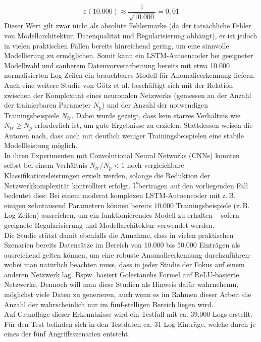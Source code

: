 \documentclass[a4paper,12pt]{article}
\begin{document}
	\[
	\varepsilon(10.000) \approx \frac{1}{\sqrt{10.000}} = 0{,}01
	\]
	Dieser Wert gilt zwar nicht als absolute Fehlermarke (da der tatsächliche Fehler von Modellarchitektur, Datenqualität und Regularisierung abhängt), er ist jedoch in vielen praktischen Fällen bereits hinreichend gering, um eine sinnvolle Modellierung zu ermöglichen. Somit kann ein LSTM-Autoencoder bei geeigneter Modellwahl und sauberem Datenvorverarbeitung bereits mit etwa 10.000 normalisierten Log-Zeilen ein brauchbares Modell für Anomalieerkennung liefern.
	\\[0.5em]
	Auch eine weitere Studie von Götz et al. \cite{Goetz2023} beschäftigt sich mit der Relation zwischen der Komplexität eines neuronalen Netzwerks (gemessen an der Anzahl der trainierbaren Parameter \( N_p \)) und der Anzahl der notwendigen Trainingsbeispiele \( N_{tr} \). Dabei wurde gezeigt, dass kein starres Verhältnis wie \( N_{tr} \geq N_p \) erforderlich ist, um gute Ergebnisse zu erzielen. Stattdessen weisen die Autoren nach, dass auch mit deutlich weniger Trainingsbeispielen eine stabile Modellleistung möglich.
	\\[0.5em]
	In ihren Experimenten mit Convolutional Neural Networks (CNNs) konnten selbst bei einem Verhältnis \( N_{tr}/N_p < 1 \) noch vergleichbare Klassifikationsleistungen erzielt werden, solange die Reduktion der Netzwerkkomplexität kontrolliert erfolgt. Übertragen auf den vorliegenden Fall bedeutet dies: Bei einem moderat komplexen LSTM-Autoencoder mit z.\,B. einigen zehntausend Parametern können bereits $10.000$ Trainingsbeispiele (z.\,B. Log-Zeilen) ausreichen, um ein funktionierendes Modell zu erhalten – sofern geeignete Regularisierung und Modellarchitektur verwendet werden. 
	\\[0.5em]
	Die Studie stützt damit ebenfalls die Annahme, dass in vielen praktischen Szenarien bereits Datensätze im Bereich von 10.000 bis 50.000 Einträgen als ausreichend gelten können, um eine robuste Anomalieerkennung durchzuführen-wobei man natürlich beachten muss, dass in jeder Studie der Fokus auf einem anderen Netzwerk lag. Bspw. basiert Golestanehs Formel auf ReLU-basierte Netzwerke. Dennoch will man diese Studien als Hinweis dafür wahrnehemn, möglichst viele Daten zu generieren, auch wenn es im Rahmen dieser Arbeit die Anzahl der wahrscheinlich nur im fünf-stelligen Bereich liegen wird.
	\\[0.5em]
	Auf Grundlage dieser Erkenntnisse wird ein Testfall mit ca. 39.000 Logs erstellt.
	\\[0.5em]
	 Für den Test befinden sich in den Testdaten ca. 31 Log-Einträge, welche durch je eines der fünf Angriffsszenarien entsteht.
\end{document}
